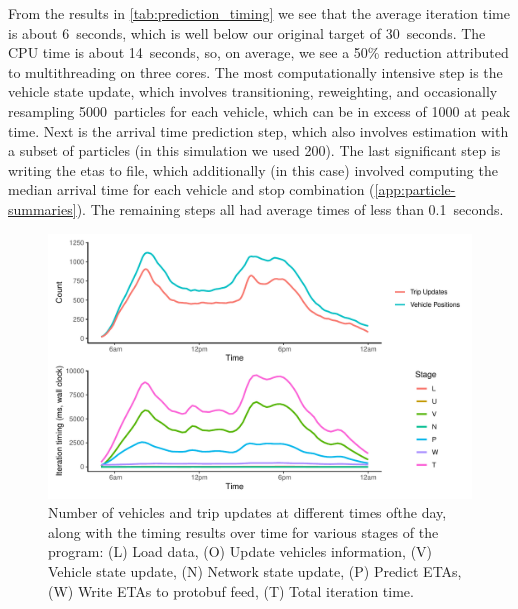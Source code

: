 From the results in \cref{tab:prediction_timing} we see that the average iteration time is about 6~seconds, which is well below our original target of 30~seconds. The CPU time is about 14~seconds, so, on average, we see a 50\% reduction attributed to multithreading on three cores. The most computationally intensive step is the vehicle state update, which involves transitioning, reweighting, and occasionally resampling 5000~particles for each vehicle, which can be in excess of 1000 at peak time. Next is the arrival time prediction step, which also involves estimation with a subset of particles (in this simulation we used 200). The last significant step is writing the \glspl{eta} to file, which additionally (in this case) involved computing the median arrival time for each vehicle and stop combination (\cref{app:particle-summaries}). The remaining steps all had average times of less than 0.1~seconds.



\begin{knitrout}\small
{}\color{fgcolor}\begin{figure}

{\centering \includegraphics[width=\textwidth]{figure/prediction_timing_time-1} 

}

\caption[Number of vehicles and trip updates at different times ofthe day, along with the timing results over time for various stages of the program]{Number of vehicles and trip updates at different times ofthe day, along with the timing results over time for various stages of the program: (L) Load data, (O) Update vehicles information, (V) Vehicle state update, (N) Network state update, (P) Predict ETAs, (W) Write ETAs to protobuf feed, (T) Total iteration time.}\label{fig:prediction_timing_time}
\end{figure}


\end{knitrout}



